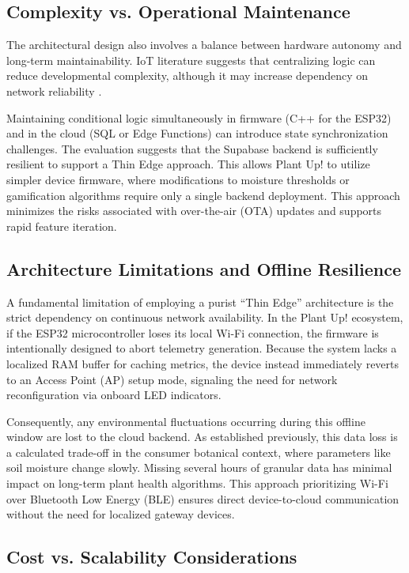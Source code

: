 \subsection{Complexity vs. Operational Maintenance}

The architectural design also involves a balance between hardware autonomy and long-term maintainability. IoT literature suggests that centralizing logic can reduce developmental complexity, although it may increase dependency on network reliability \cite{zeetimThickThin, outsourceThinThick, deepwikiSupabase}. 

Maintaining conditional logic simultaneously in firmware (C++ for the ESP32) and in the cloud (SQL or Edge Functions) can introduce state synchronization challenges. The evaluation suggests that the Supabase backend is sufficiently resilient to support a Thin Edge approach. This allows Plant Up! to utilize simpler device firmware, where modifications to moisture thresholds or gamification algorithms require only a single backend deployment. This approach minimizes the risks associated with over-the-air (OTA) updates and supports rapid feature iteration.

\subsection{Architecture Limitations and Offline Resilience}

A fundamental limitation of employing a purist ``Thin Edge'' architecture is the strict dependency on continuous network availability. In the Plant Up! ecosystem, if the ESP32 microcontroller loses its local Wi-Fi connection, the firmware is intentionally designed to abort telemetry generation. Because the system lacks a localized RAM buffer for caching metrics, the device instead immediately reverts to an Access Point (AP) setup mode, signaling the need for network reconfiguration via onboard LED indicators.

Consequently, any environmental fluctuations occurring during this offline window are lost to the cloud backend. As established previously, this data loss is a calculated trade-off in the consumer botanical context, where parameters like soil moisture change slowly. Missing several hours of granular data has minimal impact on long-term plant health algorithms. This approach prioritizing Wi-Fi over Bluetooth Low Energy (BLE) ensures direct device-to-cloud communication without the need for localized gateway devices.

\subsection{Cost vs. Scalability Considerations}

